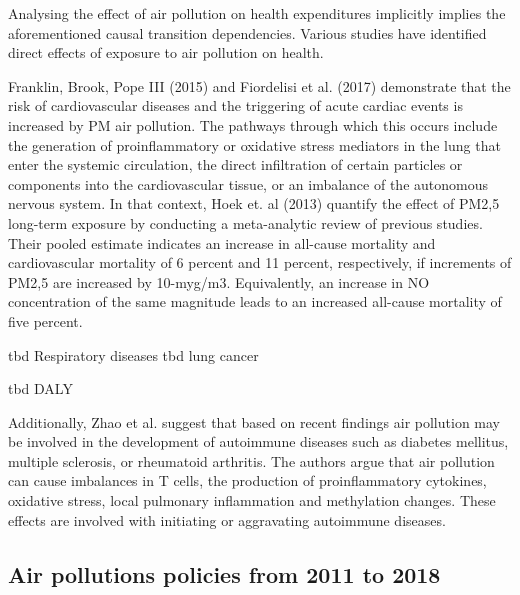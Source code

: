 \documentclass[
]{article}
\begin{document}
Analysing the effect of air pollution on health expenditures implicitly implies the aforementioned causal transition dependencies. Various studies have identified direct effects of exposure to air pollution on health. %

Franklin, Brook, Pope III (2015) and Fiordelisi et al. (2017) demonstrate that the risk of cardiovascular diseases and the triggering of acute cardiac events is increased by PM air pollution. The pathways through which this occurs include the generation of proinflammatory or oxidative stress mediators in the lung that enter the systemic circulation, the direct infiltration of certain particles or components into the cardiovascular tissue, or an imbalance of the autonomous nervous system. In that context, Hoek et. al (2013) quantify the effect of PM2,5 long-term exposure by conducting a meta-analytic review of previous studies. Their pooled estimate indicates an increase in all-cause mortality and cardiovascular mortality of 6 percent and 11 percent, respectively, if increments of PM2,5 are increased by 10-myg/m3. Equivalently, an increase in NO concentration of the same magnitude leads to an increased all-cause mortality of five percent. %

tbd Respiratory diseases %
tbd lung cancer %

tbd DALY %

Additionally, Zhao et al. suggest that based on recent findings air pollution may be involved in the development of autoimmune diseases such as diabetes mellitus, multiple sclerosis, or rheumatoid arthritis. The authors argue that air pollution can cause imbalances in T cells, the production of proinflammatory cytokines, oxidative stress, local pulmonary inflammation and methylation changes. These effects are involved with initiating or aggravating autoimmune diseases. %



\subsection{Air pollutions policies from 2011 to 2018}
\end{document}
